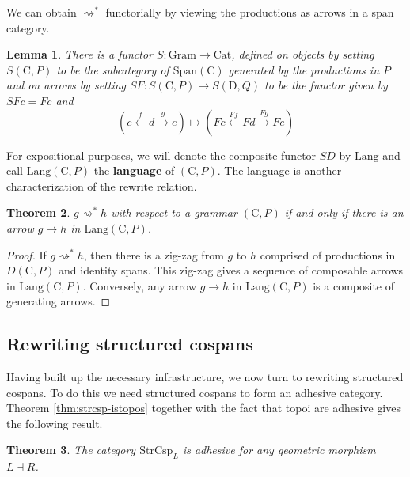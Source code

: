 \documentclass{amsart}
\newcommand{\C}{\cat{C}}
\newcommand{\D}{\cat{D}}
\newcommand{\Cat}{\cat{Cat}}
\newcommand{\Span}{\cat{Span}}
\newcommand{\Gram}{\cat{Gram}}
\newcommand{\StrCsp}{\cat{StrCsp}}
\newcommand{\Lang}{\mathrm{Lang}}
\newcommand{\defn}[1]{\textbf{#1}}
\newcommand{\cat}[1]{\mathrm{#1}}
\newcommand{\from}{\colon}
\newcommand{\xto}[1]{\xrightarrow{#1}}
\newcommand{\deriv}[2]{#1 \rightsquigarrow^\ast #2}
\newcommand{\xgets}[1]{\xleftarrow{#1}}
\newtheorem{theorem}{Theorem}[section]
\newtheorem{lemma}[theorem]{Lemma}
\theoremstyle{remark}
\theoremstyle{definition}
\begin{document}
We can obtain $ \deriv{}{} $ functorially by viewing the productions
as arrows in a span category.

\begin{lemma}
  There is a functor $ S \from \Gram \to \Cat $, defined on objects by
  setting $ S ( \C , P ) $ to be the subcategory of $ \Span ( \C ) $
  generated by the productions in $ P $ and on arrows by setting
  $ SF \from S ( \C , P ) \to S ( \D , Q ) $ to be the functor
  given by $ SFc = Fc $ and
  \[
    ( c \xgets{f} d \xto{g} e )
    \mapsto
    ( Fc \xgets{Ff} Fd \xto{Fg} Fe )
  \]
\end{lemma}

For expositional purposes, we will denote the composite functor $ SD $
by $ \Lang $ and call $ \Lang ( \C , P ) $ the \defn{language} of
$ ( \C , P ) $. The language is another characterization of the
rewrite relation.

\begin{theorem}
  $ \deriv{g}{h} $ with respect to a grammar $ ( \C , P ) $ if and
  only if there is an arrow $ g \to h $ in $ \Lang ( \C , P ) $.
\end{theorem}

\begin{proof}
  If $ \deriv{g}{h} $, then there is a zig-zag from $ g $ to $ h $
  comprised of productions in $ D ( \C , P ) $ and identity spans.
  This zig-zag gives a sequence of composable arrows in
  $ \Lang ( \C , P ) $.  Conversely, any arrow $ g \to h $ in
  $ \Lang ( \C , P ) $ is a composite of generating arrows.
\end{proof}


\subsection{Rewriting structured cospans}
\label{sec:Rewriting-StrCsp}

Having built up the necessary infrastructure, we now turn to rewriting
structured cospans. To do this we need structured cospans to form an
adhesive category. Theorem \ref{thm:strcsp-istopos} together with the
fact that topoi are adhesive \cite{LackSobo_ToposIsAdh} gives the
following result.

\begin{theorem} \label{thm:dpo_category-StrCsp-adhsv}
  The category $ \StrCsp_{L} $ is adhesive for any geometric morphism
  $ L \dashv R $.
\end{theorem}
\end{document}
